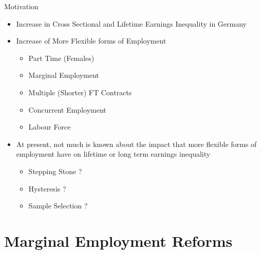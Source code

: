 \documentclass[hyperref={bookmarks=false}]{beamer}
\begin{document}
\begin{frame}{Motivation}
\begin{itemize}
\setlength{\itemsep}{0.5 cm}
\item Increase in Cross Sectional and Lifetime Earnings Inequality in Germany
\vfill
\item Increase of More Flexible forms of Employment
\vfill
\begin{itemize}
\item Part Time (Females)
\vfill
\item Marginal Employment
\vfill
\item Multiple (Shorter) FT Contracts
\vfill
\item Concurrent Employment
\vfill
\item Labour Force
\end{itemize}
\item At present, not much is known about the impact that more flexible forms of employment have on lifetime or long term earnings inequality
\vfill
\begin{itemize}
\item Stepping Stone ?
\vfill
\item Hysteresis ?
\vfill
\item Sample Selection ?
\end{itemize}
\end{itemize}
\end{frame}

\section{Marginal Employment Reforms}
\subsection{}

\begin{frame}
\end{frame}
\end{document}

